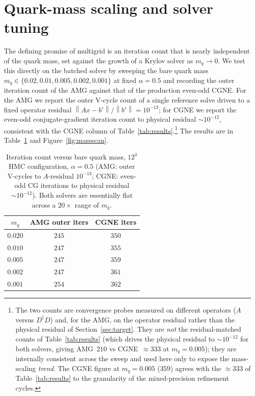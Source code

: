 \documentclass[12pt,a4paper]{article}
\newcommand{\Ddw}{D}
\newcommand{\Aop}{A}
\newcommand{\dg}{^{\dagger}}
\newcommand{\norm}[1]{\left\lVert #1 \right\rVert}
\begin{document}
\section{Quark-mass scaling and solver tuning}
\label{sec:scaling}

The defining promise of multigrid is an iteration count that is nearly independent
of the quark mass, set against the growth of a Krylov solver as $m_q\to0$. We test
this directly on the batched solver by sweeping the bare quark mass
$m_q\in\{0.02,0.01,0.005,0.002,0.001\}$ at fixed $\alpha=0.5$ and recording the
outer iteration count of the AMG against that of the production even-odd CGNE.
For the AMG we report the outer V-cycle count of a single reference solve driven to
a fixed operator residual $\norm{\Aop x-b'}/\norm{b'}=10^{-13}$; for CGNE we report
the even-odd conjugate-gradient iteration count to physical residual
$\sim\!10^{-12}$, consistent with the CGNE column of
Table~\ref{tab:results}.\footnote{%
The two counts are convergence probes measured on different operators ($\Aop$
versus $\Ddw\dg\Ddw$) and, for the AMG, on the operator residual rather than the
physical residual of Section~\ref{sec:target}. They are \emph{not} the
residual-matched counts of Table~\ref{tab:results} (which drives the physical
residual to $\sim\!10^{-12}$ for both solvers, giving AMG~$210$ vs CGNE~$\approx
333$ at $m_q=0.005$); they are internally consistent across the sweep and used here
only to expose the mass-scaling \emph{trend}. The CGNE figure at $m_q=0.005$
($359$) agrees with the $\approx\!333$ of Table~\ref{tab:results} to the
granularity of the mixed-precision refinement cycles.} The results are in
Table~\ref{tab:massscan} and Figure~\ref{fig:massscan}.

\begin{table}[h]
\centering
\begin{tabular}{ccc}
\toprule
$m_q$ & AMG outer iters & CGNE iters \\
\midrule
$0.020$ & $245$ & $350$ \\
$0.010$ & $247$ & $355$ \\
$0.005$ & $247$ & $359$ \\
$0.002$ & $247$ & $361$ \\
$0.001$ & $254$ & $362$ \\
\bottomrule
\end{tabular}
\caption{Iteration count versus bare quark mass, $12^4$ HMC configuration,
$\alpha=0.5$ (AMG: outer V-cycles to $\Aop$-residual $10^{-13}$; CGNE: even-odd CG
iterations to physical residual $\sim\!10^{-12}$). Both solvers are essentially flat
across a $20\times$ range of $m_q$.}
\label{tab:massscan}
\end{table}
\end{document}
